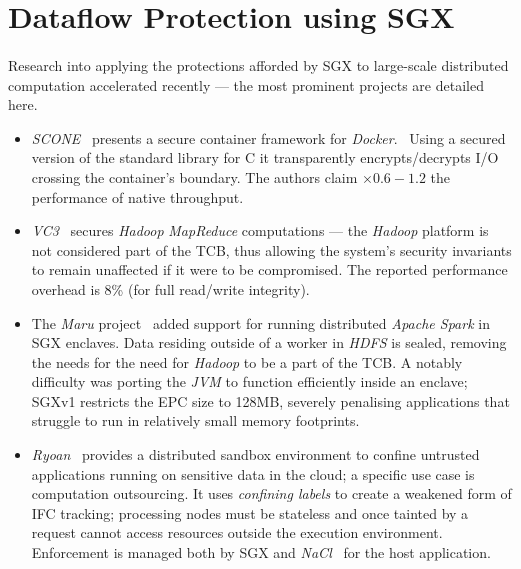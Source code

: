 \section{Dataflow Protection using SGX}
\paragraph{} Research into applying the protections afforded by SGX to large-scale distributed computation accelerated recently --- the most prominent projects are detailed here. 

\begin{itemize}
    \item \textit{SCONE}~\cite{10.5555/3026877.3026930} presents a secure container framework for \textit{Docker}.~\cite{docker-security} Using a secured version of the standard library for C it transparently encrypts/decrypts I/O crossing the container's boundary. The authors claim $\times 0.6-1.2$ the performance of native throughput.
    \item \textit{VC3}~\cite{vc37163017} secures \textit{Hadoop} \textit{MapReduce} computations --- the \textit{Hadoop} platform is not considered part of the TCB, thus allowing the system's security invariants to remain unaffected if it were to be compromised. The reported performance overhead is 8\% (for full read/write integrity).
    \item The \textit{Maru} project~\cite{maru} added support for running distributed \textit{Apache Spark} in SGX enclaves. Data residing outside of a worker in \textit{HDFS} is sealed, removing the needs for the need for \textit{Hadoop} to be a part of the TCB. A notably difficulty was porting the \textit{JVM} to function efficiently inside an enclave; SGXv1 restricts the EPC size to 128MB, severely penalising applications that struggle to run in relatively small memory footprints.
    \item \textit{Ryoan}~\cite{ryoan199358} provides a distributed sandbox environment to confine untrusted applications running on sensitive data in the cloud; a specific use case is computation outsourcing. It uses \textit{confining labels} to create a weakened form of IFC tracking; processing nodes must be stateless and once tainted by a request cannot access resources outside the execution environment. Enforcement is managed both by SGX and \textit{NaCl}~\cite{nacl} for the host application. 
\end{itemize}

